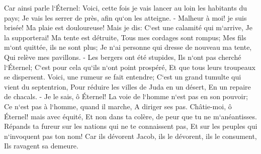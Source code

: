 \verse Car ainsi parle l`Éternel: Voici, cette fois je vais lancer au loin les habitants du pays; Je vais les serrer de près, afin qu`on les atteigne. - 
\verse Malheur à moi! je suis brisée! Ma plaie est douloureuse! Mais je dis: C`est une calamité qui m`arrive, Je la supporterai! 
\verse Ma tente est détruite, Tous mes cordages sont rompus; Mes fils m`ont quittée, ils ne sont plus; Je n`ai personne qui dresse de nouveau ma tente, Qui relève mes pavillons. - 
\verse Les bergers ont été stupides, Ils n`ont pas cherché l`Éternel; C`est pour cela qu`ils n`ont point prospéré, Et que tous leurs troupeaux se dispersent. 
\verse Voici, une rumeur se fait entendre; C`est un grand tumulte qui vient du septentrion, Pour réduire les villes de Juda en un désert, En un repaire de chacals. - 
\verse Je le sais, ô Éternel! La voie de l`homme n`est pas en son pouvoir; Ce n`est pas à l`homme, quand il marche, A diriger ses pas. 
\verse Châtie-moi, ô Éternel! mais avec équité, Et non dans ta colère, de peur que tu ne m`anéantisses. 
\verse Répands ta fureur sur les nations qui ne te connaissent pas, Et sur les peuples qui n`invoquent pas ton nom! Car ils dévorent Jacob, ils le dévorent, ils le consument, Ils ravagent sa demeure. 

